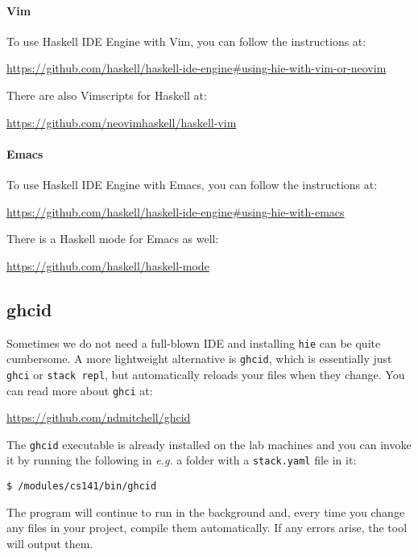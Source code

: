 \paragraph{Vim} To use Haskell IDE Engine with Vim, you can follow the instructions at:
\begin{center}\small
	\url{https://github.com/haskell/haskell-ide-engine#using-hie-with-vim-or-neovim}
\end{center}
There are also Vimscripts for Haskell at:
\begin{center}\small
\url{https://github.com/neovimhaskell/haskell-vim}
\end{center}

\paragraph{Emacs} To use Haskell IDE Engine with Emacs, you can follow the instructions at:
\begin{center}\small
	\parbox{13cm}{\centering\url{https://github.com/haskell/haskell-ide-engine\#using-hie-with-emacs}}
\end{center}
There is a Haskell mode for Emacs as well:
\begin{center} \small
\url{https://github.com/haskell/haskell-mode}
\end{center}

\subsection{ghcid}

Sometimes we do not need a full-blown IDE and installing \texttt{\small hie} can be quite cumbersome. A more lightweight alternative is \texttt{\small ghcid}, which is essentially just \texttt{\small ghci} or \texttt{\small stack repl}, but automatically reloads your files when they change. You can read more about \texttt{\small ghci} at:
\begin{center} \small
	\url{https://github.com/ndmitchell/ghcid}
\end{center}
The \texttt{\small ghcid} executable is already installed on the lab machines and you can invoke it by running the following in \emph{e.g.} a folder with a \texttt{\small stack.yaml} file in it:
\begin{verbatim}
$ /modules/cs141/bin/ghcid
\end{verbatim}
The program will continue to run in the background and, every time you change any files in your project, compile them automatically. If any errors arise, the tool will output them.

